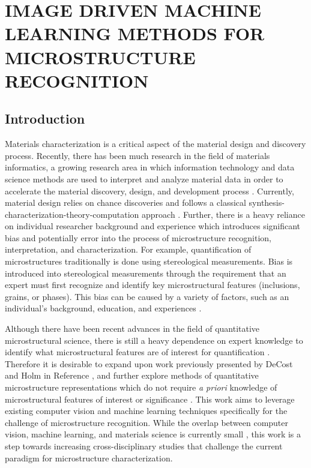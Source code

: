 \chapter{IMAGE DRIVEN MACHINE LEARNING METHODS FOR MICROSTRUCTURE RECOGNITION}
\label{chap:COMMAT}

\let\thefootnote\relax{}



\section{Introduction}
\label{intro}

Materials characterization is a critical aspect of the material design and discovery process.  Recently, there has been much research in the field of materials informatics, a growing research area in which information technology and data science methods are used to interpret and analyze material data in order to accelerate the material discovery, design, and development process \cite{XuH2015, Rodgers2006, Broderick2008, ferris2007materials, Kalidindi2011}.  Currently, material design relies on chance discoveries and follows a classical synthesis-characterization-theory-computation approach \cite{SergeiV.Kalinin2015}.  Further, there is a heavy reliance on individual researcher background and experience which introduces significant bias and potentially error into the process of microstructure recognition, interpretation, and characterization. 
%
For example, quantification of microstructures traditionally is done using stereological measurements.  Bias is introduced into stereological measurements through the requirement that an expert must first recognize and identify key microstructural features (inclusions, grains, or phases).  This bias can be caused by a variety of factors, such as an individual's background, education, and experiences \cite{SergeiV.Kalinin2015}.  

Although there have been recent advances in the field of quantitative microstructural science, there is still a heavy dependence on expert knowledge to identify what microstructural features are of interest for quantification \cite{DeCost2015}. Therefore it is desirable to expand upon work previously presented by DeCost and Holm in Reference \cite{DeCost2015}, and further explore methods of quantitative microstructure representations which do not require \textit{a priori} knowledge of microstructural features of interest or significance \cite{SergeiV.Kalinin2015}. This work aims to leverage existing computer vision and machine learning techniques specifically for the challenge of microstructure recognition.  While the overlap between computer vision, machine learning, and materials science is currently small \cite{SergeiV.Kalinin2015}, this work is a step towards increasing cross-disciplinary studies that challenge the current paradigm for microstructure characterization. 
%

